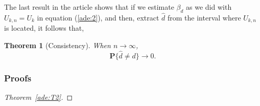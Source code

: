 \documentclass[12pt]{exam}
\def\P{\ensuremath{\mathbf{P}}}
\newtheorem{theorem}{Theorem}[section]
\theoremstyle{remark}
\begin{document}
The last result in the article shows that if we estimate $\beta_d$ as we did with $U_{k,n} = U_k$ in equation (\ref{ade:2}), and then, extract $\widehat{d}$ from the interval where $U_{k,n}$ is located, it follows that,
\begin{theorem}[Consistency]\label{ade:T4}
  When $n\to \infty$,
  \[ \P\{\widehat{d} \neq d\} \to 0.\]
\end{theorem}

\subsubsection*{Proofs}

\begin{proof}[Theorem~\ref{ade:T2}]
  
\end{proof}
\end{document}
